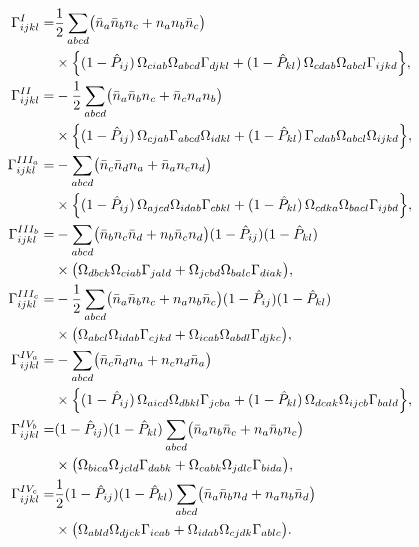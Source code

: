 \documentclass[enabledeprecatedfontcommands]{scrartcl}
\newcommand{\MyRomanNum}[1]{%
  \ifcase#1\or I\or II\or III\or IV\or V\or VI\or VII\or VIII\or IX\or X\else #1\fi}
\begin{document}
\begin{subequations}\label{eq:unfact2b}
\begin{align}
\Gamma^{\MyRomanNum{1}}_{ijkl}
  =&\frac12\sum_{abcd}
    \bigl(\bar n_a\bar n_b n_c+n_a n_b\bar n_c\bigr)
    \nonumber\\
  &\times\Bigl\{
    (1-\hat P_{ij})\,\Omega_{ciab}\Omega_{abcd}\Gamma_{djkl}
   +(1-\hat P_{kl})\,\Omega_{cdab}\Omega_{abcl}\Gamma_{ijkd}
  \Bigr\},\\
\Gamma^{\MyRomanNum{2}}_{ijkl}
  =&-\frac12\sum_{abcd}
    \bigl(\bar n_a\bar n_b n_c+\bar n_c n_a n_b\bigr)
    \nonumber\\
  &\times\Bigl\{
    (1-\hat P_{ij})\,\Omega_{cjab}\Gamma_{abcd}\Omega_{idkl}
   +(1-\hat P_{kl})\,\Gamma_{cdab}\Omega_{abcl}\Omega_{ijkd}
  \Bigr\},\\
\Gamma^{\MyRomanNum{3}_a}_{ijkl}
  =&-\sum_{abcd}
    \bigl(\bar n_c\bar n_d n_a+\bar n_a n_c n_d\bigr)
    \nonumber\\
  &\times\Bigl\{
    (1-\hat P_{ij})\,\Omega_{ajcd}\Omega_{idab}\Gamma_{cbkl}
   +(1-\hat P_{kl})\,\Omega_{cdka}\Omega_{bacl}\Gamma_{ijbd}
  \Bigr\},\\
\Gamma^{\MyRomanNum{3}_b}_{ijkl}
  =&-\sum_{abcd}
    \bigl(\bar n_b n_c \bar n_d+n_b\bar n_c  n_d\bigr)
    (1-\hat P_{ij})(1-\hat P_{kl})
    \nonumber\\
  &\times\bigl(
    \Omega_{dbck}\Omega_{ciab}\Gamma_{jald}
   +\Omega_{jcbd}\Omega_{balc}\Gamma_{diak}
  \bigr),\\
\Gamma^{\MyRomanNum{3}_c}_{ijkl}
  =&-\frac12\sum_{abcd}
    \bigl(\bar n_a\bar n_b n_c+n_a n_b\bar n_c\bigr)
    (1-\hat P_{ij})(1-\hat P_{kl})
    \nonumber\\
  &\times\bigl(
    \Omega_{abcl}\Omega_{idab}\Gamma_{cjkd}
   +\Omega_{icab}\Omega_{abdl}\Gamma_{djkc}
  \bigr),\\
\Gamma^{\MyRomanNum{4}_a}_{ijkl}
  =&-\sum_{abcd}
    \bigl(\bar n_c\bar n_d n_a+n_c n_d\bar n_a\bigr)
    \nonumber\\
  &\times\Bigl\{
    (1-\hat P_{ij})\,\Omega_{aicd}\Omega_{dbkl}\Gamma_{jcba}
   +(1-\hat P_{kl})\,\Omega_{dcak}\Omega_{ijcb}\Gamma_{bald}
  \Bigr\},\\
\Gamma^{\MyRomanNum{4}_b}_{ijkl}
  =&(1-\hat P_{ij})(1-\hat P_{kl})
    \sum_{abcd}
    \bigl(\bar n_a n_b\bar n_c+n_a\bar n_b n_c\bigr)
    \nonumber\\
  &\times\bigl(
    \Omega_{bica}\Omega_{jcld}\Gamma_{dabk}
   +\Omega_{cabk}\Omega_{jdlc}\Gamma_{bida}
  \bigr),\\
\Gamma^{\MyRomanNum{4}_c}_{ijkl}
  =&\frac12(1-\hat P_{ij})(1-\hat P_{kl})
    \sum_{abcd}
    \bigl(\bar n_a\bar n_b n_d+n_a n_b\bar n_d\bigr)
    \nonumber\\
  &\times\bigl(
    \Omega_{abld}\Omega_{djck}\Gamma_{icab}
   +\Omega_{idab}\Omega_{cjdk}\Gamma_{ablc}
  \bigr).
\end{align}
\end{subequations}
\end{document}
